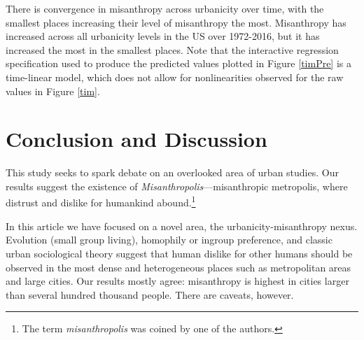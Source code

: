 \documentclass[11pt, letterpaper]{article}
\begin{document}
\begin{spacing}{1.4}
There is convergence in misanthropy across urbanicity over time, with the
smallest places increasing their level of misanthropy the most. Misanthropy has
increased across all urbanicity levels in the US over 1972-2016, but it has
increased the most in the smallest places. %
 Note that the interactive regression
specification used to produce the predicted values plotted in Figure
\ref{timPre} is a time-linear model, which does not allow for nonlinearities observed for the raw values in Figure \ref{tim}.

%


\section*{Conclusion and Discussion}

This study seeks to spark debate on an overlooked area of urban studies. 
 Our results suggest the existence of
\emph{Misanthropolis}---misanthropic metropolis,  where distrust and dislike for humankind
abound.\footnote{The term \emph{misanthropolis} was coined by one of the authors.}


In this article we have focused on a  novel area, the urbanicity-misanthropy
nexus. %
Evolution  (small group living),  homophily or ingroup preference, and classic urban sociological theory suggest that human dislike for other humans should be observed in the most dense and heterogeneous places such as metropolitan areas and large cities. Our results mostly agree: misanthropy is highest in cities larger than several hundred thousand people. There are caveats, however. 


\end{spacing}
\end{document}
